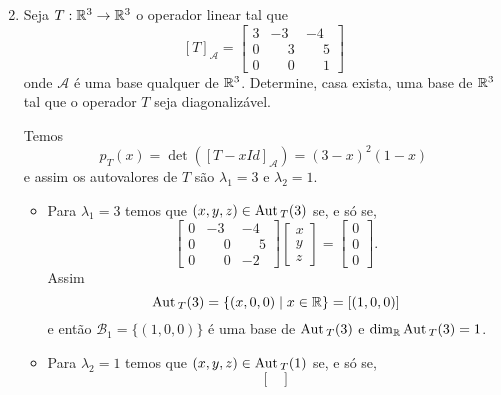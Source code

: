 \begin{exemplo}
\begin{enumerate}[label={\arabic*})]
\begin{solucao}
\[            \]
        \end{solucao}
        \item Seja $T : \mathbb{R}^3 \to \mathbb{R}^3$ o operador linear tal que
        \[
            [T]_\mathcal{A} = \begin{bmatrix}
                                3 & -3 & -4\\
                                0 & \phantom{-}3 & \phantom{-}5\\
                                0 & \phantom{-}0 & \phantom{-}1
                            \end{bmatrix}
        \]
        onde $\mathcal{A}$ \'e uma base qualquer de $\mathbb{R}^3$. Determine, casa exista, uma base de $\mathbb{R}^3$ tal que o operador $T$ seja diagonaliz\'avel.
        \begin{solucao}
            Temos
            \[
                p_T(x) = \det([T - xId]_\mathcal{A}) = (3 - x)^2(1 - x)
            \]
            e assim os autovalores de $T$ s\~ao $\lambda_1 = 3$ e $\lambda_2 = 1$.
            \begin{itemize}
                \item Para $\lambda_1 = 3$ temos que $(x,y,z) \in {\rm Aut\,}_T(3)$ se, e s\'o se,
                \[
                    \begin{bmatrix}
                        0 & -3 & -4\\
                        0 & \phantom{-}0 & \phantom{-}5\\
                        0 & \phantom{-}0 & -2
                    \end{bmatrix}\begin{bmatrix}
                        x\\y\\z
                    \end{bmatrix} = \begin{bmatrix}
                        0\\0\\0
                    \end{bmatrix}.
                \]
                Assim
                \[
                    {\rm Aut\,}_T(3) = \{(x,0,0) \mid x \in \mathbb{R}\} = [(1,0,0)]
                \]
                e ent\~ao $\mathcal{B}_1 = \{(1,0,0)\}$ \'e uma base de ${\rm Aut\,}_T(3)$ e $\dim_{\mathbb{R}}{\rm Aut\,}_T(3) = 1$.
                \item Para $\lambda_2 = 1$ temos que $(x,y,z) \in {\rm Aut\,}_T(1)$ se, e s\'o se,
                \[
                    \begin{bmatrix}

\end{bmatrix}\]
\end{itemize}
\end{solucao}
\end{enumerate}
\end{exemplo}
